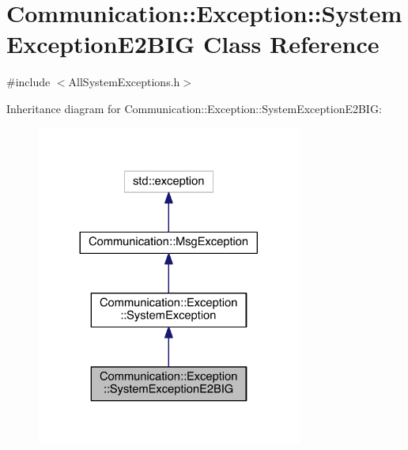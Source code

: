 \hypertarget{class_communication_1_1_exception_1_1_system_exception_e2_b_i_g}{}\section{Communication\+:\+:Exception\+:\+:System\+Exception\+E2\+B\+I\+G Class Reference}
\label{class_communication_1_1_exception_1_1_system_exception_e2_b_i_g}


{\ttfamily \#include $<$All\+System\+Exceptions.\+h$>$}



Inheritance diagram for Communication\+:\+:Exception\+:\+:System\+Exception\+E2\+B\+I\+G\+:\nopagebreak
\begin{figure}[H]
\begin{center}
\leavevmode
\includegraphics[width=248pt]{class_communication_1_1_exception_1_1_system_exception_e2_b_i_g__inherit__graph}
\end{center}
\end{figure}


